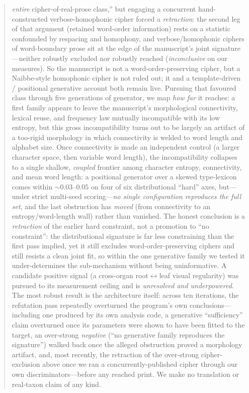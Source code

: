 \documentclass[11pt]{article}
\begin{document}
\begin{abstract}
\emph{entire} cipher-of-real-prose class,'' but engaging a concurrent hand-constructed
verbose-homophonic cipher \citep{greshko2025naibbe} forced a \emph{retraction}: the second leg
of that argument (retained word-order information) rests on a statistic confounded by
respacing and homophony, and verbose/homophonic ciphers of word-boundary prose sit at the edge
of the manuscript's joint signature---neither robustly excluded nor robustly reached
(\emph{inconclusive} on our measures). So the manuscript is not a word-order-preserving cipher,
but a Naibbe-style homophonic cipher is not ruled out; it and a template-driven / positional
generative account both remain live. Pursuing that favoured class through five generations of
generator, we map \emph{how far} it reaches: a first family appears to leave the
manuscript's morphological connectivity, lexical reuse, and frequency law mutually
incompatible with its low entropy, but this gross incompatibility turns out to be largely
an artifact of a too-rigid morphology in which connectivity is welded to word length and
alphabet size. Once connectivity is made an independent control (a larger character space,
then variable word length), the incompatibility collapses to a single shallow, \emph{coupled}
frontier among character entropy, connectivity, and mean word length: a positional generator
over a skewed type-lexicon comes within $\sim\!0.03$--$0.05$ on four of six distributional
``hard'' axes, but---under strict multi-seed scoring---\emph{no single configuration
reproduces the full set}, and the last obstruction has \emph{moved} (from connectivity to an
entropy/word-length wall) rather than vanished. The honest conclusion is a \emph{retraction}
of the earlier hard constraint, not a promotion to ``no constraint'': the distributional
signature is far less constraining than the first pass implied, yet it still excludes
word-order-preserving ciphers and still resists a clean joint fit, so within the one
generative family we tested it under-determines the sub-mechanism without being uninformative. A candidate positive signal (a
cross-organ root$\leftrightarrow$leaf visual regularity) was pursued to its measurement
ceiling and is \emph{unresolved and underpowered}. The most robust result is the
architecture itself: across ten iterations, the refutation pass repeatedly overturned
the program's own conclusions---including one produced by its own analysis code, a
generative ``sufficiency'' claim overturned once its parameters were shown to have been
fitted to the target, an over-strong \emph{negative} (``no generative family reproduces the
signature'') walked back once the alleged obstruction proved a morphology artifact, and,
most recently, the retraction of the over-strong cipher-exclusion above once we ran a
concurrently-published cipher through our own discriminators---before any reached print. We
make no translation or real-taxon claim of any kind.
\end{abstract}
\end{document}
